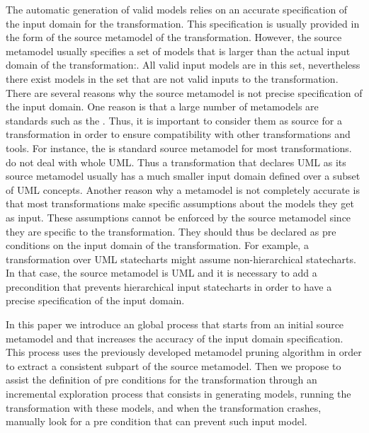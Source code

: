 The automatic generation of valid models relies on an accurate specification of the input domain for the transformation. This specification is usually provided in the form of the source metamodel of the transformation. However, the source metamodel usually specifies a set of models that is larger than the actual input domain of the transformation:. All valid input models are in this set, nevertheless there exist models in the set that are not valid inputs to the transformation. There are several reasons why the source metamodel is not precise specification of the input domain. 
One reason is that a large number of metamodels are standards such as the {\UML}. Thus, it is important to consider them as source for a transformation in order to ensure compatibility with other transformations and tools. For instance, the {\UML} is standard source metamodel for most transformations. do not deal with whole UML. Thus a transformation that declares UML as its source metamodel usually has a much smaller input domain defined over a subset of UML concepts. Another reason why a metamodel is not completely accurate is that most transformations make specific assumptions about the models they get as input. These assumptions cannot be enforced by the source metamodel since they are specific to the transformation. They should thus be declared as pre conditions on the input domain of the transformation. For example, a transformation over UML statecharts might assume non-hierarchical statecharts. In that case, the source metamodel is UML and it is necessary to add a precondition that prevents hierarchical input statecharts in order to have a precise specification of the input domain.

In this paper we introduce an global process that starts from an initial source metamodel and that increases the accuracy of the input domain specification. This process uses the previously developed metamodel pruning algorithm \cite{sen2009b} in order to extract a consistent subpart of the source metamodel. Then we propose to assist the definition of pre conditions for the transformation through an incremental exploration process that consists in generating models, running the transformation with these models, and when the transformation crashes, manually look for a pre condition that can prevent such input model.

